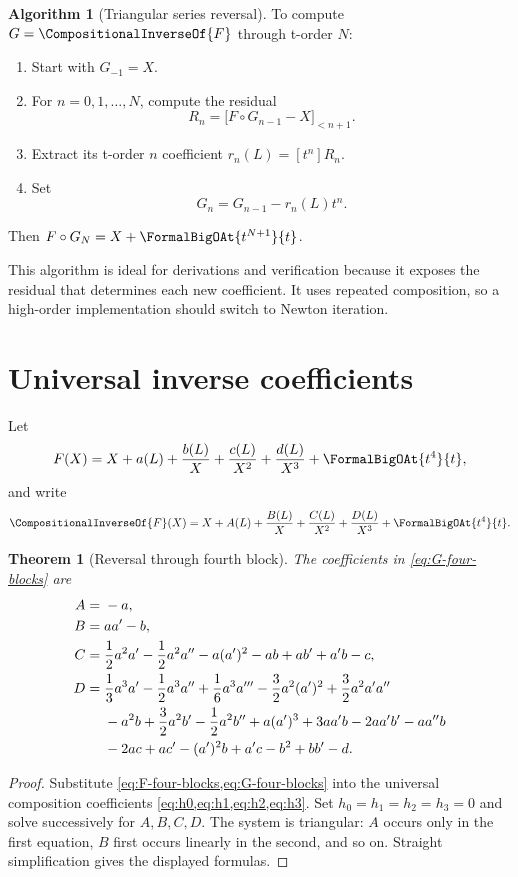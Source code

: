 \documentclass[11pt,openany]{book}
\theoremstyle{definition}
\newtheorem{algorithm}{Algorithm}[chapter]
\theoremstyle{plain}
\newtheorem{theorem}{Theorem}[chapter]
\theoremstyle{remark}
\newcommand{\rev}[1]{\CompositionalInverseOf{#1}}
\newcommand{\compose}{\mathbin{\circ}}
\begin{document}
\begin{algorithm}[Triangular series reversal]\label{alg:triangular-reversion}
To compute \(G=\rev{F}\) through t-order \(N\):
\begin{enumerate}
\item Start with \(G_{-1}=X\).
\item For \(n=0,1,\ldots,N\), compute the residual
\[
 R_n=\bigl[F\compose G_{n-1}-X\bigr]_{<n+1}.
\]
\item Extract its t-order \(n\) coefficient \(r_n(L)=[t^n]R_n\).
\item Set
\[
 G_n=G_{n-1}-r_n(L)t^n.
\]
\end{enumerate}
Then \(F\compose G_N=X+\FormalBigOAt{t^{N+1}}{t}\).
\end{algorithm}

This algorithm is ideal for derivations and verification because it exposes the
residual that determines each new coefficient.  It uses repeated composition,
so a high-order implementation should switch to Newton iteration.

\section{Universal inverse coefficients}
Let
\begin{equation}\label{eq:F-four-blocks}
 F(X)=X+a(L)+\frac{b(L)}X+\frac{c(L)}{X^2}
      +\frac{d(L)}{X^3}+\FormalBigOAt{t^4}{t},
\end{equation}
and write
\begin{equation}\label{eq:G-four-blocks}
 \rev{F}(X)=X+A(L)+\frac{B(L)}X+\frac{C(L)}{X^2}
      +\frac{D(L)}{X^3}+\FormalBigOAt{t^4}{t}.
\end{equation}

\begin{theorem}[Reversal through fourth block]\label{thm:inverse-coefficients}
The coefficients in \cref{eq:G-four-blocks} are
\begin{align}
 A={}&-a,\label{eq:inverse-A}\\
 B={}&aa'-b,\label{eq:inverse-B}\\
 C={}&\frac12a^2a'-\frac12a^2a''-a(a')^2-ab+ab'+a'b-c,
 \label{eq:inverse-C}\\
 D={}&\frac13a^3a'-\frac12a^3a''+\frac16a^3a'''
 -\frac32a^2(a')^2+\frac32a^2a'a''\notag\\
 &{}-a^2b+\frac32a^2b'-\frac12a^2b''
 +a(a')^3+3aa'b-2aa'b'-aa''b\notag\\
 &{}-2ac+ac'-(a')^2b+a'c-b^2+bb'-d.
 \label{eq:inverse-D}
\end{align}
\end{theorem}
\begin{proof}
Substitute \cref{eq:F-four-blocks,eq:G-four-blocks} into the universal
composition coefficients \cref{eq:h0,eq:h1,eq:h2,eq:h3}.  Set
\(h_0=h_1=h_2=h_3=0\) and solve successively for \(A,B,C,D\).  The system is
triangular: \(A\) occurs only in the first equation, \(B\) first occurs linearly
in the second, and so on.  Straight simplification gives the displayed
formulas.
\end{proof}
\end{document}
